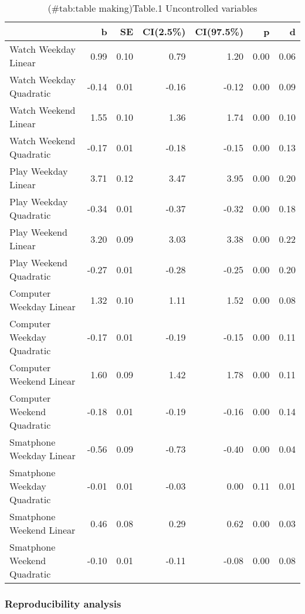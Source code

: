 \documentclass[man]{apa6}
\theoremstyle{definition}
\theoremstyle{definition}
\theoremstyle{definition}
\theoremstyle{remark}
\begin{document}
\begin{table}

\caption{(\#tab:table making)Table.1 Uncontrolled variables}
\centering
\begin{tabular}[t]{l|r|r|r|r|r|r}
\hline
  & b & SE & CI(2.5\%) & CI(97.5\%) & p & d\\
\hline
Watch Weekday Linear & 0.99 & 0.10 & 0.79 & 1.20 & 0.00 & 0.06\\
\hline
Watch Weekday Quadratic & -0.14 & 0.01 & -0.16 & -0.12 & 0.00 & 0.09\\
\hline
Watch Weekend Linear & 1.55 & 0.10 & 1.36 & 1.74 & 0.00 & 0.10\\
\hline
Watch Weekend Quadratic & -0.17 & 0.01 & -0.18 & -0.15 & 0.00 & 0.13\\
\hline
Play Weekday Linear & 3.71 & 0.12 & 3.47 & 3.95 & 0.00 & 0.20\\
\hline
Play Weekday Quadratic & -0.34 & 0.01 & -0.37 & -0.32 & 0.00 & 0.18\\
\hline
Play Weekend Linear & 3.20 & 0.09 & 3.03 & 3.38 & 0.00 & 0.22\\
\hline
Play Weekend Quadratic & -0.27 & 0.01 & -0.28 & -0.25 & 0.00 & 0.20\\
\hline
Computer Weekday Linear & 1.32 & 0.10 & 1.11 & 1.52 & 0.00 & 0.08\\
\hline
Computer Weekday Quadratic & -0.17 & 0.01 & -0.19 & -0.15 & 0.00 & 0.11\\
\hline
Computer Weekend Linear & 1.60 & 0.09 & 1.42 & 1.78 & 0.00 & 0.11\\
\hline
Computer Weekend Quadratic & -0.18 & 0.01 & -0.19 & -0.16 & 0.00 & 0.14\\
\hline
Smatphone Weekday Linear & -0.56 & 0.09 & -0.73 & -0.40 & 0.00 & 0.04\\
\hline
Smatphone Weekday Quadratic & -0.01 & 0.01 & -0.03 & 0.00 & 0.11 & 0.01\\
\hline
Smatphone Weekend Linear & 0.46 & 0.08 & 0.29 & 0.62 & 0.00 & 0.03\\
\hline
Smatphone Weekend Quadratic & -0.10 & 0.01 & -0.11 & -0.08 & 0.00 & 0.08\\
\hline
\end{tabular}
\end{table}

\subsubsection{Reproducibility analysis}\label{reproducibility-analysis}
\end{document}
